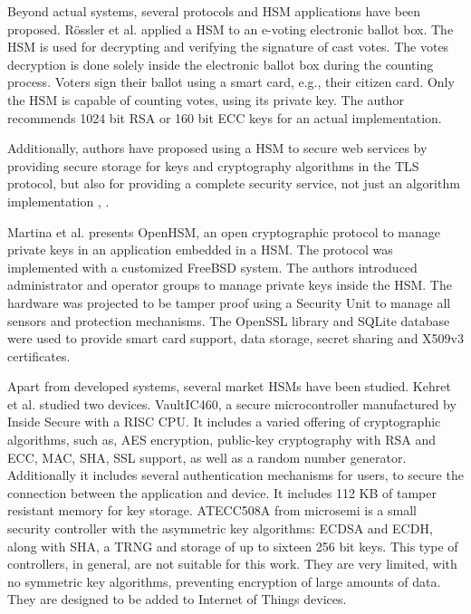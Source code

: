 Beyond actual systems, several protocols and HSM applications have been proposed.
Rössler et al. \cite{rossler2005voting} applied a HSM to an e-voting electronic ballot box. The HSM is used for decrypting and verifying the signature of cast votes.
The votes decryption is done solely inside the electronic ballot box during the counting process.
Voters sign their ballot using a smart card, e.g., their citizen card.
Only the HSM is capable of counting votes, using its private key.
The author recommends 1024 bit RSA or 160 bit ECC keys for an actual implementation.

Additionally, authors have proposed using a HSM to secure web services by providing secure storage for keys and cryptography algorithms in the TLS protocol, but also for providing a complete security service, not just an algorithm implementation \cite{baldwin2003hardware}, \cite{mont2003secure}.

Martina et al. \cite{openhsm} presents OpenHSM, an open cryptographic protocol to manage private keys in an application embedded in a HSM.
The protocol was implemented with a customized FreeBSD system. The authors introduced administrator and operator groups to manage
private keys inside the HSM. The hardware was projected to be tamper proof using a Security Unit to manage all sensors and protection mechanisms.
The OpenSSL library and SQLite database were used to provide smart card support, data storage, secret sharing and X509v3 certificates.

Apart from developed systems, several market HSMs have been studied.
Kehret et al. \cite{tlsintegration} studied two devices. VaultIC460, a secure microcontroller manufactured by Inside Secure with a RISC CPU. It includes a varied offering of cryptographic algorithms, such as, AES encryption, public-key cryptography with RSA and ECC, MAC, SHA, SSL support, as well as a random number generator. Additionally it includes several authentication mechanisms for users, to secure the connection between the application and device.
It includes 112 KB of tamper resistant memory for key storage.
ATECC508A from microsemi is a small security controller with the asymmetric key algorithms: ECDSA and ECDH, along with SHA, a TRNG and storage of up to sixteen 256 bit keys.
This type of controllers, in general, are not suitable for this work. They are very limited, with no symmetric key algorithms, preventing encryption of large amounts of data. They are designed to be added to Internet of Things devices.

